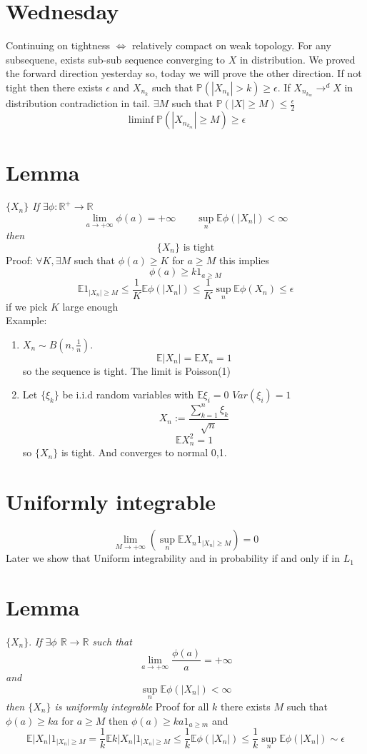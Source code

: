 \documentclass[11pt]{article}
\begin{document}
\section{Wednesday}
Continuing on tightness $\iff$ relatively compact on weak topology.
For any subsequene, exists  sub-sub sequence converging to $X$ in distribution. We proved the forward direction yesterday so, today we will prove the
other direction. If not tight then there exists $\epsilon$ and $X_{n_k}$ such that  $ \mathbb{P}(|X_{n_k}| > k) \ge \epsilon$. If $X_{n_{k_m}} \rightarrow^{d} X$ in distribution contradiction in tail.
$\exists M $ such that  $ \mathbb{P}(|X| \ge M) \le \frac{\epsilon}{2}$
\[
    \liminf_{  } \mathbb{P}(|X_{n_{k_m}}| \ge M) \ge \epsilon
\] 

\section{Lemma}
\emph{
$\{X_n\}$ If  $\exists \phi: \mathbb{R}^{+} \rightarrow \mathbb{R}$ 
\[
    \lim_{a\to +\infty}\phi(a) = +\infty \qquad \sup_{n}\mathbb{E} \phi(|X_n|) < \infty
\] 
then
\[
    \{X_n\} \text{ is tight}
\] 
}
Proof: $\forall K, \exists M $ such that $\phi(a) \ge K$ for $a \ge M$ this implies
\[
    \phi(a) \ge k 1_{a \ge M}
\] 
\[
    \mathbb{E}1_{|X_n| \ge M} \le \frac{1}{K} \mathbb{E} \phi(|X_n|) \le \frac{1}{K} \sup_n \mathbb{E} \phi(X_n) \le \epsilon
\] 
if we pick $K$ large enough\\
Example: 
\begin{enumerate}
    \item $X_n \sim B(n,\frac{1}{n})$. 
        \[
        \mathbb{E}|X_n| = \mathbb{E}X_n = 1
        \] 
        so the sequence is tight. The limit is Poisson(1)
    \item Let $\{\xi_k\}$ be i.i.d random variables with  $ \mathbb{E}\xi_i = 0$ $Var(\xi_i) =  1$
         \[
             X_{n} := \frac{\sum_{k=1}^{n}\xi_k}{\sqrt{n}}
        \] 
        \[
        \mathbb{E}X_n^2 = 1
        \] 
        so $\{X_n\}$ is tight. And converges to normal 0,1.
\end{enumerate}

\section{Uniformly integrable}
\[
    \lim_{M\to+\infty }(\sup_n \mathbb{E}X_n 1_{|X_n| \ge M}) = 0
\] 
Later we show that Uniform integrability and in probability if and only if in $L_1$

\section{Lemma} $\{X_n\}$. 
\emph{
    If $\exists \phi$ $ \mathbb{R} \rightarrow \mathbb{R}$ such that
    \[
    \lim_{a\to +\infty}\frac{\phi(a)}{a} = +\infty
    \] 
    and
    \[
        \sup_{n} \mathbb{E} \phi(|X_n|) < \infty
    \] 
    then $\{X_n\}$ is uniformly integrable
} 
Proof for all $k$ there exists $M$ such that $\phi(a) \ge ka$ for $a \ge M$ then $\phi(a) \ge ka 1_{a \ge m}$ and
\[
    \mathbb{E}|X_n|1_{|X_n|\ge M} = \frac{1}{k} \mathbb{E}k|X_n|1_{|X_n|\ge M} \le \frac{1}{k} \mathbb{E} \phi(|X_n|) \le \frac{1}{k} \sup_{n} \mathbb{E} \phi(|X_n|) \sim \epsilon
\] 
\end{document}
